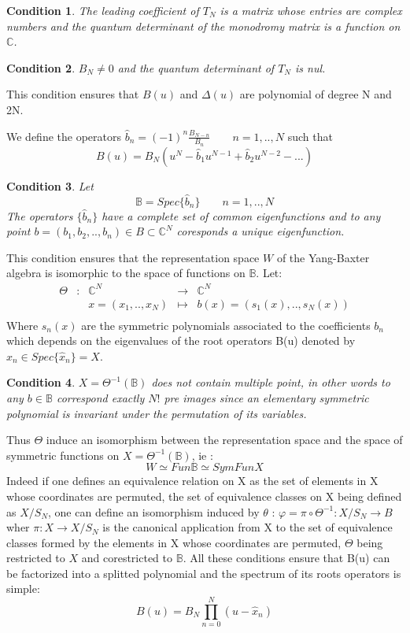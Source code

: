\documentclass[12pt]{article}
\newtheorem{cdt}{Condition}[section]
\begin{document}
\begin{cdt}
The leading coefficient of $T_{N}$ is a matrix whose entries are complex numbers and the quantum determinant of the monodromy matrix is a function on $\mathbb{C}$.
\end{cdt} %
\begin{cdt}
$B_{N}\neq 0$ and the quantum determinant of $T_{N}$ is nul.
\end{cdt}
This condition ensures that $B(u)$ and $\Delta(u)$ are polynomial of degree N and 2N. 

We define the operators $\widehat{b}_{n}=(-1)^{n}\frac{B_{N-n}}{B_{n}} \qquad n=1,..,N$ such that 
\begin{equation}
B(u)=B_{N}(u^{N}-\widehat{b}_{1}u^{N-1}+\widehat{b}_{2}u^{N-2}-...)	
\end{equation}
\begin{cdt}
Let  $$\mathbb{B}=Spec\{\widehat{b}_{n}\} \qquad n=1,..,N$$ 
The operators $\{\widehat{b}_{n}\}$ have a complete set of common eigenfunctions and to any point 
$b=(b_{1},b_{2},..,b_{n})\in B\subset \mathbb{C}^{N}$ coresponds a unique eigenfunction. %
\end{cdt}

This condition ensures that the representation space $W$ of the Yang-Baxter algebra is isomorphic to the space of functions on $\mathbb{B}$.
Let:
$$\begin{array}{ccccc}
\Theta & : & \mathbb{C}^{N} & \to & \mathbb{C}^{N} \\
 & & x=(x_{1},..,x_{N}) & \mapsto & b(x)=(s_{1}(x),..,s_{N}(x)) \\
\end{array}$$
Where $s_{n}(x)$ are the symmetric polynomials associated to the coefficients  $b_{n}$ which depends on the eigenvalues of the root operators B(u) denoted by  $x_{n}\in Spec\{\widehat{x}_{n}\}=X$.
\begin{cdt}
$X=\Theta^{-1}(\mathbb{B})$ does not contain multiple point, in other words to any  $b\in\mathbb{B}$ correspond exactly $N!$ pre images since an elementary symmetric polynomial is invariant under the permutation of its variables.
\end{cdt}
Thus $\Theta$ induce an isomorphism between the representation space and the space of symmetric functions on
$X=\Theta^{-1}(\mathbb{B})$, ie : $$W\simeq Fun\mathbb{B} \simeq SymFunX$$
Indeed if one defines an equivalence relation on X as the set of elements in X whose coordinates are permuted, the set of equivalence classes on X being defined as  $X/S_{N}$, one can define an isomorphism induced by  $\theta$ : $\varphi=\pi\circ\Theta^{-1} : X/S_{N}\to B$
wher $\pi:X\to X/S_{N}$ is the canonical application from X to the set of equivalence classes formed by the elements in X whose coordinates are permuted, $\Theta$ being restricted to $X$ and corestricted to $\mathbb{B}$.
All these conditions ensure that B(u) can be factorized into a splitted polynomial and the spectrum of its roots operators is simple: 
\begin{equation}
B(u)=B_{N}\prod_{n=0}^{N}(u-\widehat{x}_{n})
\end{equation}  
\end{document}
